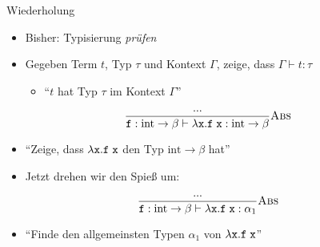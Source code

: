 \documentclass{beamer}
\begin{document}
\begin{frame}{Wiederholung}
	\begin{itemize}
		\item Bisher: Typisierung \emph{prüfen}
		\item Gegeben Term $t$, Typ $\tau$ und Kontext $\Gamma$, zeige, dass $\Gamma \vdash t : \tau$
		\begin{itemize}
			\item \enquote{$t$ hat Typ $\tau$ im Kontext $\Gamma$}
		\end{itemize}
	\end{itemize}

	\begin{equation*}
		\typeRule{Abs}{
			...
		}{
			\texttt{f} : \textrm{int} \to \beta \vdash \abs{\texttt{x}}{\liin{\texttt{f}}{\texttt{x}}} : \textrm{int} \to \beta
		}
	\end{equation*}
	
	\begin{itemize}
		\item \enquote{Zeige, dass $\abs{\texttt{x}}{\liin{\texttt{f}}{\texttt{x}}}$ den Typ $\textrm{int} \to \beta$ hat}
		\pause
		\item Jetzt drehen wir den Spieß um:
	\end{itemize}

	\begin{equation*}
		\typeRule{Abs}{
			...
		}{
			\texttt{f} : \textrm{int} \to \beta \vdash \abs{\texttt{x}}{\liin{\texttt{f}}{\texttt{x}}} : \alpha_1
		}
	\end{equation*}

	\begin{itemize}
		\item \enquote{Finde den allgemeinsten Typen $\alpha_1$ von $\abs{\texttt{x}}{\liin{\texttt{f}}{\texttt{x}}}$}
	\end{itemize}
\end{frame}
\end{document}
